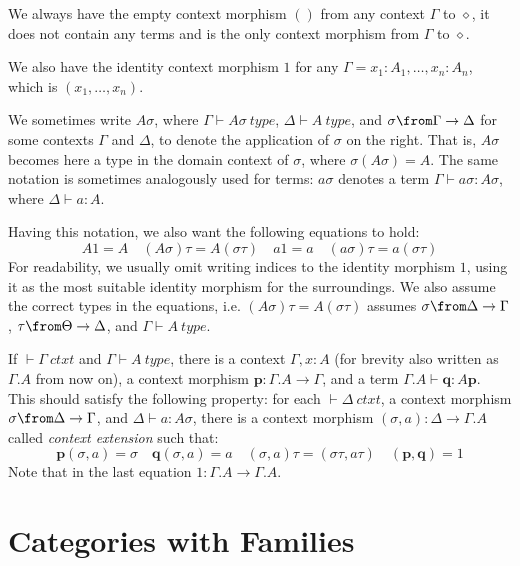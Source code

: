 \begin{example}
  We always have the empty context morphism $()$ from any context $\Gamma$ to
  $\diamond$, it does not contain any terms and is the only context morphism
  from $\Gamma$ to $\diamond$.
\end{example}
\begin{example}
  We also have the identity context morphism $1$ for any $\Gamma = x_1 : A_1,
  \dots, x_n : A_n$, which is $(x_1, \dots, x_n)$.
\end{example}

We sometimes write $A\sigma$, where $\Gamma \vdash A\sigma~type$, $\Delta
\vdash A~type$, and $\sigma \from \Gamma \to \Delta$ for some contexts $\Gamma$
and $\Delta$, to denote the application of $\sigma$ on the right. That is,
$A\sigma$ becomes here a type in the domain context of $\sigma$, where
$\sigma(A\sigma) = A$. The same notation is sometimes analogously used for
terms: $a\sigma$ denotes a term $\Gamma \vdash a\sigma : A\sigma$, where
$\Delta \vdash a : A$.

Having this notation, we also want the following equations to hold:
\[
  A1=A \quad (A\sigma)\tau = A(\sigma\tau) \quad a1=a \quad (a\sigma)\tau=a(\sigma\tau)
\]
For readability, we usually omit writing indices to the identity morphism $1$,
using it as the most suitable identity morphism for the surroundings. We also
assume the correct types in the equations, i.e. $(A\sigma)\tau = A(\sigma\tau)$
assumes $\sigma \from \Delta \to \Gamma$, $\tau \from \Theta \to \Delta$, and
$\Gamma \vdash A~type$.

\begin{definition}
  If $\vdash \Gamma~ctxt$ and $\Gamma \vdash A~type$, there is a context
  $\Gamma, x:A$ (for brevity also written as $\Gamma.A$ from now on), a context
  morphism $\mathbf{p}: \Gamma.A \to \Gamma$, and a term $\Gamma.A \vdash
  \mathbf{q} : A \mathbf{p}$. This should satisfy the following property: for
  each $\vdash \Delta~ctxt$, a context morphism $\sigma \from \Delta \to
  \Gamma$, and $\Delta \vdash a : A \sigma$, there is a context morphism
  $(\sigma, a): \Delta \to \Gamma.A$ called \emph{context extension} such that:
  \[
    \mathbf{p}(\sigma, a) = \sigma \quad \mathbf{q}(\sigma, a) = a \quad (\sigma, a) \tau =
    (\sigma \tau, a \tau) \quad (\mathbf{p}, \mathbf{q}) = 1
  \]
  Note that in the last equation $1: \Gamma.A \to \Gamma.A$.
\end{definition}

\section*{Categories with Families}

